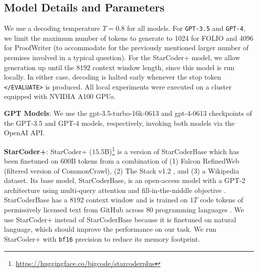 \subsection{Model Details and Parameters} \label{sec:appendix_model_details}
We use a decoding temperature $T=0.8$ for all models. 
For \texttt{GPT-3.5} and \texttt{GPT-4}, we limit the maximum number of tokens to generate to 1024 for FOLIO and 4096 for ProofWriter (to accommodate for the previously mentioned larger number of premises involved in a typical question).
For the StarCoder+ model, we allow generation up until the $8192$ context window length, since this model is run locally. In either case, decoding is halted early whenever the stop token \texttt{</EVALUATE>} is produced. All local experiments were executed on a cluster equipped with NVIDIA A100 GPUs.

\textbf{GPT Models}: We use the gpt-3.5-turbo-16k-0613 and gpt-4-0613 checkpoints of the GPT-3.5 \citep{ouyang2022training} and GPT-4 \citep{openai2023gpt4} models, respectively, invoking both models via the OpenAI API. 

\textbf{StarCoder+}: StarCoder+ ($15.5$B)\footnote{\url{https://huggingface.co/bigcode/starcoderplus}} is a version of StarCoderBase \citep{li2023starcoder} which has been finetuned on 600B tokens from a combination of (1) Falcon RefinedWeb \citep{refinedweb} (filtered version of CommonCrawl), (2) The Stack v1.2 \citep{kocetkov2022stack}, and (3) a Wikipedia dataset. Its base model, StarCoderBase, is an open-access model with a GPT-2 architecture using multi-query attention \citep{shazeer2019fast} and fill-in-the-middle objective \citep{bavarian2022efficient}. StarCoderBase has a $8192$ context window and is trained on $1T$ code tokens of permissively licensed text from GitHub across $80$ programming languages \citep{li2023starcoder}. We use StarCoder+ instead of StarCoderBase because it is finetuned on natural language, which should improve the performance on our task. We run StarCoder+ with \texttt{bf16} precision to reduce its memory footprint.